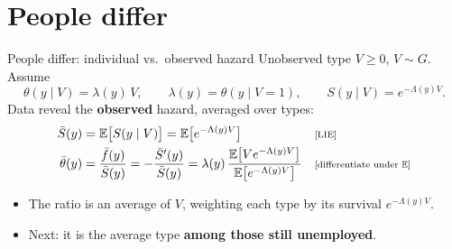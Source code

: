 \documentclass[aspectratio=169,10pt]{beamer}
\newcommand{\E}{\mathbb{E}}
\newcommand{\why}[1]{\text{\scriptsize[#1]}}
\begin{document}
\section{People differ}
\begin{frame}[label=m-pop]{People differ: individual vs.\ observed hazard}
  Unobserved type $V\ge0$, $V\sim G$. Assume
  \[ \theta(y\mid V)=\lambda(y)\,V, \qquad \lambda(y)=\theta(y\mid V=1),\qquad S(y\mid V)=e^{-\Lambda(y)V}. \]
  Data reveal the \textbf{observed} hazard, averaged over types:
  \begin{align*}
    \bar S(y) &= \E\big[S(y\mid V)\big]=\E\big[e^{-\Lambda(y)V}\big] && \why{LIE} \\
    \bar\theta(y) &= \frac{\bar f(y)}{\bar S(y)} = -\frac{\bar S'(y)}{\bar S(y)} = \lambda(y)\,\frac{\E\big[V e^{-\Lambda(y)V}\big]}{\E\big[e^{-\Lambda(y)V}\big]} && \why{differentiate under $\E$}
  \end{align*}
  \begin{itemize}
    \item The ratio is an average of $V$, weighting each type by its survival $e^{-\Lambda(y)V}$.
    \item Next: it is the average type \textbf{among those still unemployed}.
  \end{itemize}
  \vfill\hfill\hyperlink{p-pop}{}
\end{frame}
\end{document}
